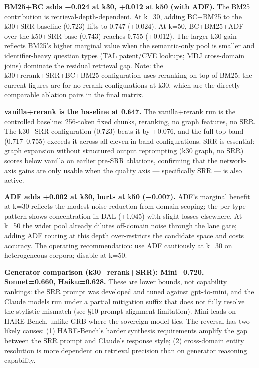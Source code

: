 \textbf{BM25+BC adds +0.024 at k30, +0.012 at k50 (with ADF).} The BM25 contribution is retrieval-depth-dependent. At k=30, adding BC+BM25 to the k30+SRR baseline (0.723) lifts to 0.747 (+0.024). At k=50, BC+BM25+ADF over the k50+SRR base (0.743) reaches 0.755 (+0.012). The larger k30 gain reflects BM25's higher marginal value when the semantic-only pool is smaller and identifier-heavy question types (TAL patent/CVE lookups; MDJ cross-domain joins) dominate the residual retrieval gap. Note: the k30+rerank+SRR+BC+BM25 configuration uses reranking on top of BM25; the current figures are for no-rerank configurations at k30, which are the directly comparable ablation pairs in the final matrix.

\textbf{vanilla+rerank is the baseline at 0.647.} The vanilla+rerank run is the controlled baseline: 256-token fixed chunks, reranking, no graph features, no SRR. The k30+SRR configuration (0.723) beats it by +0.076, and the full top band (0.717--0.755) exceeds it across all eleven in-band configurations. SRR is essential: graph expansion without structured output reprompting (k30 graph, no SRR) scores below vanilla on earlier pre-SRR ablations, confirming that the network-axis gains are only usable when the quality axis --- specifically SRR --- is also active.

\textbf{ADF adds +0.002 at k30, hurts at k50 (−0.007).} ADF's marginal benefit at k=30 reflects the modest noise reduction from domain scoping; the per-type pattern shows concentration in DAL (+0.045) with slight losses elsewhere. At k=50 the wider pool already dilutes off-domain noise through the lane gate; adding ADF routing at this depth over-restricts the candidate space and costs accuracy. The operating recommendation: use ADF cautiously at k=30 on heterogeneous corpora; disable at k=50.

\textbf{Generator comparison (k30+rerank+SRR): Mini=0.720, Sonnet=0.660, Haiku=0.628.} These are lower bounds, not capability rankings: the SRR prompt was developed and tuned against gpt-4o-mini, and the Claude models run under a partial mitigation suffix that does not fully resolve the stylistic mismatch (see §10 prompt alignment limitation). Mini leads on HARE-Bench, unlike GRB where the sovereign model ties. The reversal has two likely causes: (1) HARE-Bench's harder synthesis requirements amplify the gap between the SRR prompt and Claude's response style; (2) cross-domain entity resolution is more dependent on retrieval precision than on generator reasoning capability.

